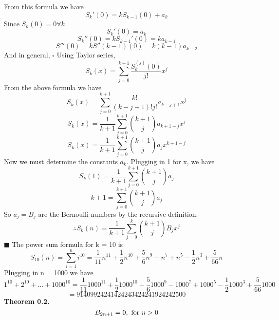 \documentclass[12pt]{article}
\begin{document}
From this formula we have
\[S_k'(0) = kS_{k-1}(0) + a_k\]
Since \(S_k(0) = 0 \forall k\)
\[S_k'(0) = a_k\]
\[S_k''(0) = kS_{k-1}'(0) = ka_{k-1}\]
\[S'''(0) = kS''(k-1)(0) = k(k-1)a_{k-2}\]
And in general, \newline
{}
\newline \(\square\) \newline
Using Taylor series,
\[S_k(x) = \sum_{j=0}^{k+1}\frac{S_k^{(j)}(0)}{j!}x^j\]
From the above formula we have
\[S_k(x) = \sum_{j=0}^{k+1}\frac{k!}{(k-j+1)!j!}a_{k-j+1}x^j\]
\[S_k(x) = \frac{1}{k+1}\sum_{j=0}^{k+1}\binom{k+1}{j}a_{k+1-j}x^j\]
\[S_k(x) = \frac{1}{k+1}\sum_{j=0}^{k+1}\binom{k+1}{j}a_jx^{k+1-j}\]
Now we must determine the constants \(a_k\). Plugging in 1 for x, we have
\[S_k(1) = \frac{1}{k+1}\sum_{j=0}^{k+1}\binom{k+1}{j}a_j\]
\[k+1 = \sum_{j=0}^{k+1}\binom{k+1}{j}a_j\]
So \(a_j = B_j\) are the Bernoulli numbers by the recursive definition.
\[\therefore S_k(n) = \frac{1}{k+1}\sum_{j=0}^k\binom{k+1}{j}B_jx^j\]
\(\blacksquare\)
\newline
The power sum formula for k = 10 is
\[S_{10}(n) = \sum_{i=1}^ni^{10} = \frac{1}{11}n^{11} + \frac{1}{2}n^{10} + \frac{5}{6}n^9 -n^7 + n^5 -\frac{1}{2}n^3 + \frac{5}{66}n\]
Plugging in n = 1000 we have
\[1^{10} + 2^{10} + ... + 1000^{10} = \frac{1}{11}1000^{11} + \frac{1}{2}1000^{10} + \frac{5}{6}1000^9 -1000^7 + 1000^5 -\frac{1}{2}1000^3 + \frac{5}{66}1000\]
\[ = 91409924241424243424241924242500\]
\textbf{Theorem 0.2.}
\newline
\[B_{2n+1} = 0, \textup{ for } n > 0\]
\newpage

\end{document}
